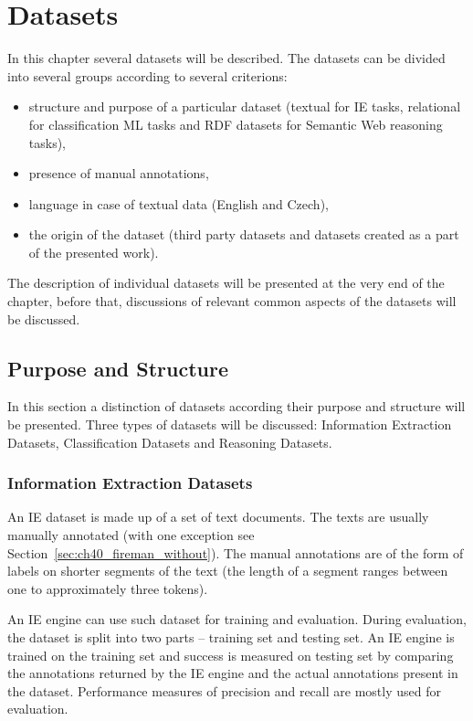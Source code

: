 \chapter{Datasets}

\graphicspath{{../img/ch40/}}



In this chapter several datasets will be described. The datasets can be divided into several groups according to several criterions: 
\begin{itemize}
	\item structure and purpose of a particular dataset (textual for IE tasks, relational for classification ML tasks and RDF datasets for Semantic Web reasoning tasks), 
	\item presence of manual annotations,
	\item language in case of textual data (English and Czech), 
	\item the origin of the dataset (third party datasets and datasets created as a part of the presented work).
\end{itemize}
The description of individual datasets will be presented at the very end of the chapter, before that, discussions of relevant common aspects of the datasets will be discussed.


\section{Purpose and Structure}
In this section a distinction of datasets according their purpose and structure will be presented. Three types of datasets will be discussed: Information Extraction Datasets, Classification Datasets and Reasoning Datasets.

\subsection{Information Extraction Datasets}
An IE dataset is made up of a set of text documents. The texts are usually manually annotated (with one exception see Section~\ref{sec:ch40_fireman_without}). The manual annotations are of the form of labels on shorter segments of the text (the length of a segment ranges between one to approximately three tokens). 

An IE engine can use such dataset for training and evaluation. During evaluation, the dataset is split into two parts -- training set and testing set. An IE engine is trained on the training set and success is measured on testing set by comparing the annotations returned by the IE engine and the actual annotations present in the dataset.
Performance measures of precision and recall are mostly used for evaluation. 

